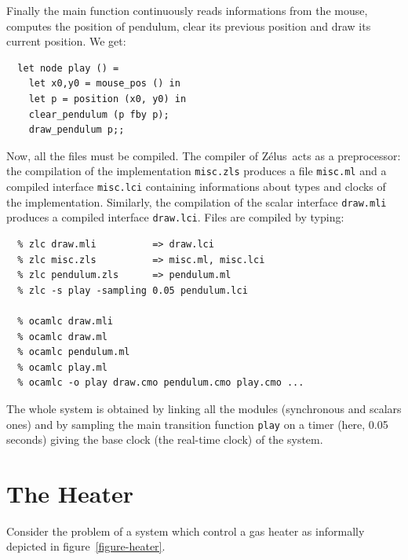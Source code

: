\documentclass[11pt,titlepage,twoside]{report}
\newcommand{\zelus}{{\sf Z\'elus}}
\begin{document}
Finally the main function continuously reads
informations from the mouse, computes the position of pendulum, clear
its previous position and draw its current position. We get:

\begin{verbatim}
  let node play () =
    let x0,y0 = mouse_pos () in
    let p = position (x0, y0) in
    clear_pendulum (p fby p);
    draw_pendulum p;;
\end{verbatim}

Now, all the files must be compiled. The compiler of \zelus\ acts as a
preprocessor: the compilation of the implementation \verb-misc.zls-
produces a file \verb-misc.ml- and a compiled interface
\verb-misc.lci- containing informations about types and clocks of the
implementation. Similarly, the compilation of the scalar interface
\verb-draw.mli- produces a compiled interface \verb-draw.lci-. Files
are compiled by typing:

\begin{verbatim}
  % zlc draw.mli          => draw.lci
  % zlc misc.zls          => misc.ml, misc.lci
  % zlc pendulum.zls      => pendulum.ml
  % zlc -s play -sampling 0.05 pendulum.lci
  
  % ocamlc draw.mli
  % ocamlc draw.ml
  % ocamlc pendulum.ml
  % ocamlc play.ml
  % ocamlc -o play draw.cmo pendulum.cmo play.cmo ...
\end{verbatim}
The whole system is obtained by linking all the modules
(synchronous and scalars ones) and by sampling the main transition 
function \verb-play- on a timer (here, 0.05 seconds) giving the base
clock (the real-time clock) of the system.

\section{The Heater}
\label{heater}
Consider the problem of a system which control a gas heater as
informally depicted in figure~\ref{figure-heater}.
\end{document}
